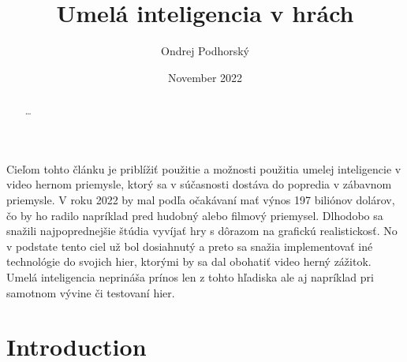 \documentclass{article}
\title{Umelá inteligencia v hrách}
\author{Ondrej Podhorský}
\date{November 2022}
\begin{document}
\maketitle

\begin{abstract}
\ldots
\end{abstract}

Cieľom tohto článku je priblížiť použitie a možnosti použitia umelej inteligencie v video hernom priemysle, ktorý sa v súčasnosti dostáva do popredia v zábavnom priemysle. V roku 2022 by mal podľa očakávaní mať výnos 197 biliónov dolárov, čo by ho radilo napríklad pred hudobný alebo filmový priemysel. Dlhodobo sa snažili najpoprednejšie štúdia vyvíjať hry s dôrazom  na grafickú realistickosť. No v podstate tento ciel už bol dosiahnutý a preto sa snažia implementovať iné technológie do svojich hier, ktorými by sa dal obohatiť video herný zážitok. Umelá inteligencia neprináša prínos len z tohto hľadiska ale aj napríklad pri samotnom vývine či testovaní hier.

\section{Introduction}
\end{document}
